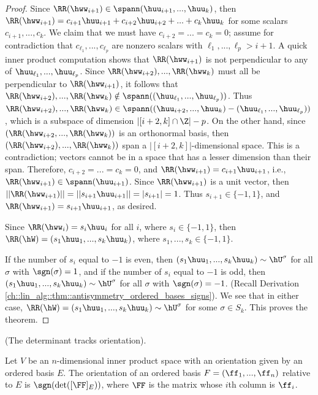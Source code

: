 \begin{proof}
    Since $\RR(\hww_{i + 1}) \in \spann(\huu_{i + 1}, ..., \huu_k)$, then $\RR(\hww_{i + 1}) = c_{i + 1} \huu_{i + 1} + c_{i + 2} \huu_{i + 2} + ... + c_k \huu_k$ for some scalars $c_{i + 1}, ..., c_k$. We claim that we must have $c_{i + 2} = ... = c_k = 0$; assume for contradiction that $c_{\ell_1}, ..., c_{\ell_p}$ are nonzero scalars with $\ell_1, ..., \ell_p > i + 1$. A quick inner product computation shows that $\RR(\hww_{i + 1})$ is not perpendicular to any of $\huu_{\ell_1}, ..., \huu_{\ell_p}$. Since $\RR(\hww_{i + 2}), ..., \RR(\hww_k)$ must all be perpendicular to $\RR(\hww_{i + 1})$, it follows that $\RR(\hww_{i + 2}), ..., \RR(\hww_k) \notin \spann((\huu_{\ell_1}, ..., \huu_{\ell_p}))$. Thus $\RR(\hww_{i + 2}), ..., \RR(\hww_k) \in \spann((\huu_{i + 2}, ..., \huu_k) - (\huu_{\ell_1}, ..., \huu_{\ell_p}))$, which is a subspace of dimension $|[i + 2, k] \cap \Z| - p$. On the other hand, since $(\RR(\hww_{i + 2}, ..., \RR(\hww_k))$ is an orthonormal basis, then $(\RR(\hww_{i + 2}), ..., \RR(\hww_k))$ span a $|[i + 2, k]|$-dimensional space. This is a contradiction; vectors cannot be in a space that has a lesser dimension than their span. Therefore, $c_{i + 2} = ... = c_k = 0$, and $\RR(\hww_{i + 1}) = c_{i + 1} \huu_{i + 1}$, i.e., $\RR(\hww_{i + 1}) \in \spann(\huu_{i + 1})$. Since $\RR(\hww_{i + 1})$ is a unit vector, then $||\RR(\hww_{i + 1})|| = ||s_{i + 1} \huu_{i + 1}|| = |s_{i + 1}| = 1$. Thus $s_{i + 1} \in \{-1, 1\}$, and $\RR(\hww_{i + 1}) = s_{i + 1} \huu_{i + 1}$, as desired.

    \vspace{.25cm}

    Since $\RR(\hww_i) = s_i \huu_i$ for all $i$, where $s_i \in \{-1, 1\}$, then $\RR(\hW) = (s_1 \huu_1, ..., s_k \huu_k)$, where $s_1, ..., s_k \in \{-1, 1\}$. 

    If the number of $s_i$ equal to $-1$ is even, then ${(s_1 \huu_1, ..., s_k \huu_k) \sim \hU^\sigma}$ for all $\sigma$ with $\sgn(\sigma) = 1$, and if the number of $s_i$ equal to $-1$ is odd, then ${(s_1 \huu_1, ..., s_k \huu_k) \sim \hU^\sigma}$ for all $\sigma$ with $\sgn(\sigma) = -1$. (Recall Derivation     \ref{ch::lin_alg::thm::antisymmetry_ordered_bases_signs}). We see that in either case, ${\RR(\hW) = (s_1 \huu_1, ..., s_k \huu_k) \sim \hU^\sigma}$ for some $\sigma \in S_k$. This proves the theorem.
\end{proof}

\begin{theorem}
\label{ch::lin_alg::thm::det_tracks_orientation}
    (The determinant tracks orientation). 
    
    Let $V$ be an $n$-dimensional inner product space with an orientation given by an ordered basis $E$. The orientation of an ordered basis $F = (\ff_1, ..., \ff_n)$ relative to $E$ is $\sgn(\det([\FF]_E))$, where $\FF$ is the matrix whose $i$th column is $\ff_i$.
\end{theorem}

